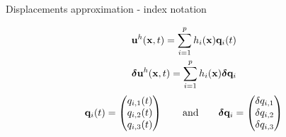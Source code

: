 \documentclass[aspectratio=169]{beamer}
\begin{document}
\begin{frame}{Displacements approximation - index notation}
  \begin{block}{}
    \vspace{-.5cm}
    \begin{align*}
      \mathbf u^{h}(\mathbf x,t)=\sum_{i=1}^{p}h_{i}(\mathbf x)\mathbf q_{i}(t) \\
      \boldsymbol\delta \mathbf u^{h}(\mathbf x,t)=\sum_{i=1}^{p}h_{i}(\mathbf x)\boldsymbol\delta\mathbf q_{i}
    \end{align*}
    {\small
    $$\mathbf q_i(t)=\begin{pmatrix}
        q_{i,1}(t) \\
        q_{i,2}(t) \\
        q_{i,3}(t) \\
      \end{pmatrix}\qquad \mbox{and} \qquad
      \boldsymbol\delta\mathbf q_{i}=\begin{pmatrix}
        \delta q_{i,1} \\
        \delta q_{i,2} \\
        \delta q_{i,3} \\
      \end{pmatrix}
    $$
    }
  \end{block}
\end{frame}
\end{document}
